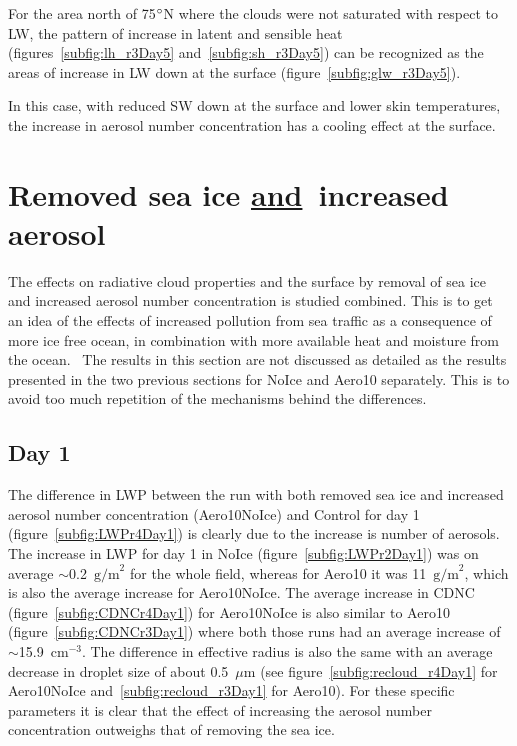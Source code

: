 For the area north of 75$\degree$N where the clouds were not saturated with respect to LW, the pattern of increase in latent and sensible heat (figures~\ref{subfig:lh_r3Day5} and~\ref{subfig:sh_r3Day5}) can be recognized as the areas of increase in LW down at the surface (figure~\ref{subfig:glw_r3Day5}).

In this case, with reduced SW down at the surface and lower skin temperatures, the increase in aerosol number concentration has a cooling effect at the surface.

\clearpage
\section{Removed sea ice \underline{and}~increased aerosol}
The effects on radiative cloud properties and the surface by removal of sea ice and increased aerosol number concentration is studied combined. This is to get an idea of the effects of increased pollution from sea traffic as a consequence of more ice free ocean, in combination with more available heat and moisture from the ocean.%
~The results in this section are not discussed as detailed as the results presented in the two previous sections for NoIce and Aero10 separately. This is to avoid too much repetition of the mechanisms behind the differences.

\subsection{Day 1}
The difference in LWP between the run with both removed sea ice and increased aerosol number concentration (Aero10NoIce) and Control for day 1 (figure~\ref{subfig:LWPr4Day1}) is clearly due to the increase is number of aerosols. The increase in LWP for day 1 in NoIce (figure~\ref{subfig:LWPr2Day1}) was on average $\sim$0.2~$\text{g/m}^2$ for the whole field, whereas for Aero10 it was 11~$\text{g/m}^2$, which is also the average increase for Aero10NoIce. The average increase in CDNC (figure~\ref{subfig:CDNCr4Day1}) for Aero10NoIce is also similar to Aero10 (figure~\ref{subfig:CDNCr3Day1}) where both those runs had an average increase of $\sim$15.9~$\text{cm}^{-3}$. The difference in effective radius is also the same with an average decrease in droplet size of about 0.5~$\mu\text{m}$ (see figure~\ref{subfig:recloud_r4Day1} for Aero10NoIce and~\ref{subfig:recloud_r3Day1} for Aero10). For these specific parameters it is clear that the effect of increasing the aerosol number concentration outweighs that of removing the sea ice.

